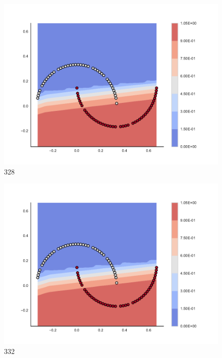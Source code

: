 \begin{subfigure}[b]{0.09\textwidth}
    \includegraphics[clip, trim=2.35cm 1.75cm 4.5cm 0cm,width=\textwidth]{img/convergence/328.pdf}
    \caption{328}
    \label{fig:convergence_328}
\end{subfigure}
%
\begin{subfigure}[b]{0.09\textwidth}
    \includegraphics[clip, trim=2.35cm 1.75cm 4.5cm 0cm,width=\textwidth]{img/convergence/332.pdf}
    \caption{332}
    \label{fig:convergence_332}
\end{subfigure}
%
